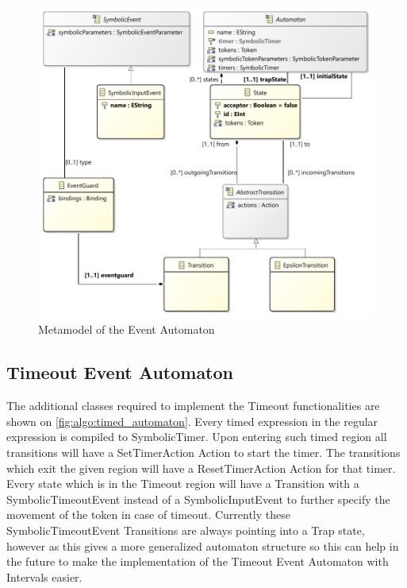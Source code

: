 \begin{figure}[h]
	\centering
	\includegraphics[width=\linewidth]{figures/chapter_5/Basic_automaton_diagram}
	\caption{Metamodel of the Event Automaton}
	\label{fig:algo:basic_automaton}
\end{figure}

\subsection{Timeout Event Automaton}

The additional classes required to implement the Timeout functionalities are shown on \cref{fig:algo:timed_automaton}.
Every timed expression in the regular expression is compiled to SymbolicTimer. Upon entering such timed region all transitions will have a SetTimerAction Action to start the timer. The transitions which exit the given region will have a ResetTimerAction Action for that timer. Every state which is in the Timeout region will have a Transition with a SymbolicTimeoutEvent instead of a SymbolicInputEvent to further specify the movement of the token in case of timeout. Currently these SymbolicTimeoutEvent Transitions are always pointing into a Trap state, however as this gives a more generalized automaton structure so this can help in the future to make the implementation of the Timeout Event Automaton with Intervals easier.


